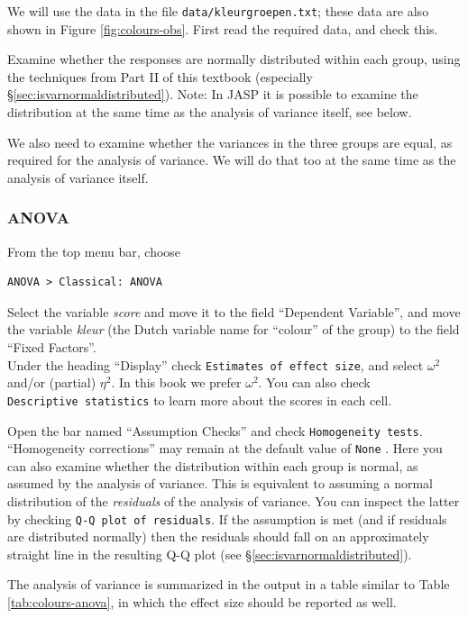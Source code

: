 \documentclass[
]{book}
\begin{document}
We will use the data in the file \texttt{data/kleurgroepen.txt}; these data are also shown in Figure \ref{fig:colours-obs}.
First read the required data, and check this.

Examine whether the responses are normally distributed within each group, using the
techniques from Part II of this textbook (especially
§\ref{sec:isvarnormaldistributed}).
Note: In JASP it is possible to examine the distribution at the same time as the analysis of variance itself, see below.

We also need to examine whether the variances in the three groups
are equal, as required for the analysis of variance. We will do that too at the same
time as the analysis of variance itself.

\hypertarget{anova-1}{%
\subsubsection{ANOVA}\label{anova-1}}

From the top menu bar, choose

\begin{verbatim}
ANOVA > Classical: ANOVA
\end{verbatim}

Select the variable \emph{score} and move it to the field ``Dependent Variable'', and move the variable \emph{kleur} (the Dutch variable name for ``colour'' of the group) to the field ``Fixed Factors''.\\
Under the heading ``Display'' check \texttt{Estimates\ of\ effect\ size}, and select \(\omega^2\) and/or (partial) \(\eta^2\). In this book we prefer \(\omega^2\).
You can also check \texttt{Descriptive\ statistics} to learn more about the scores in each cell.

Open the bar named ``Assumption Checks'' and check \texttt{Homogeneity\ tests}.
``Homogeneity corrections'' may remain at the default value of \texttt{None} .
Here you can also examine whether the distribution within each group is normal, as assumed by the analysis of variance. This is equivalent to assuming a normal distribution of the \emph{residuals} of the analysis of variance. You can inspect the latter by checking \texttt{Q-Q\ plot\ of\ residuals}. If the assumption is met (and if residuals are distributed normally) then the residuals should fall on an approximately straight line in the resulting Q-Q plot (see §\ref{sec:isvarnormaldistributed}).

The analysis of variance is summarized in the output in a table similar to Table \ref{tab:colours-anova}, in which the effect size should be reported as well.
\end{document}
